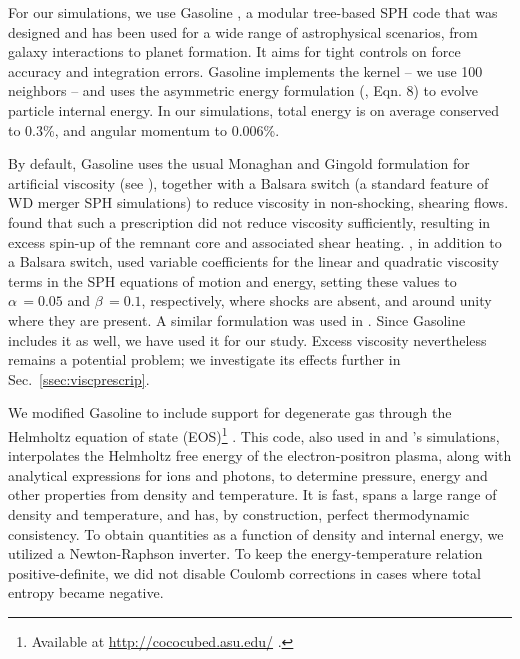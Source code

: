 For our simulations, we use Gasoline \citep{wadssq04}, a modular tree-based SPH code that was designed and has been used for a wide range of astrophysical scenarios, from galaxy interactions to planet formation.  It aims for tight controls on force accuracy and integration errors.  Gasoline implements the \cite{hernk89} kernel -- we use 100 neighbors -- and uses the asymmetric energy formulation (\citeauthor{wadssq04}, Eqn. 8) to evolve particle internal energy.  In our simulations, total energy is on average conserved to 0.3\%, and angular momentum to 0.006\%.

By default, Gasoline uses the usual Monaghan and Gingold formulation for artificial viscosity (see \citealt{mona05}), together with a Balsara switch (a standard feature of WD merger SPH simulations) to reduce viscosity in non-shocking, shearing flows.  \cite{guerig04} found that such a prescription did not reduce viscosity sufficiently, resulting in excess spin-up of the remnant core and associated shear heating.  \cite{yoonpr07}, in addition to a Balsara switch, used variable coefficients for the linear and quadratic viscosity terms in the SPH equations of motion and energy, setting these values to $\alpha\,=0.05$ and $\beta\,=0.1$, respectively, where shocks are absent, and around unity where they are present.  A similar formulation was used in \cite{dan+11,dan+12}.  Since Gasoline includes it as well, we have used it for our study.  Excess viscosity nevertheless remains a potential problem;  we investigate its effects further in Sec.~\ref{ssec:viscprescrip}.

We modified Gasoline to include support for degenerate gas through the Helmholtz equation of state (EOS)\footnote{Available at \url{http://cococubed.asu.edu/} .} \citep{timms00}.  This code, also used in \cite{rask+12} and \cite{dan+12}'s simulations, interpolates the Helmholtz free energy of the electron-positron plasma, along with analytical expressions for ions and photons, to determine pressure, energy and other properties from density and temperature.  It is fast, spans a large range of density and temperature, and has, by construction, perfect thermodynamic consistency.  To obtain quantities as a function of density and internal energy, we utilized a Newton-Raphson inverter.  To keep the energy-temperature relation positive-definite, we did not disable Coulomb corrections in cases where total entropy became negative.


